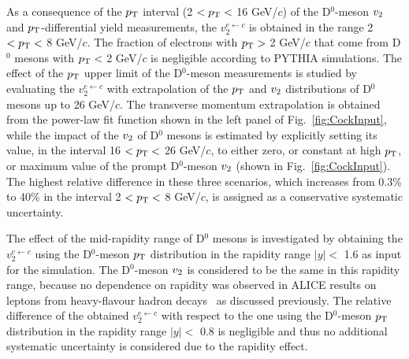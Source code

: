 \documentclass[11pt,a4paper]{article}
\providecommand{\pT}{$p_{\rm T}$ }
\providecommand{\vtwo}{$v_{\rm 2}$ }
\begin{document}
As a consequence of the \pT interval (2 $<  p_{\rm T} <$ 16 GeV/$c$) of the D$^{0}$-meson \vtwo and $p_{\rm T}$-differential yield measurements, the  $v_{2}^{e \leftarrow c}$ is obtained in the range 2 $< p_{\rm T} <$ 8 GeV/$c$.
The fraction of electrons with $p_{\rm T} >$ 2 GeV/$c$ that come from D$^{0}$ mesons with $p_{\rm T} <$ 2 GeV/$c$ is negligible according to PYTHIA simulations.
The effect of the \pT upper limit  of the D$^{0}$-meson measurements is studied by evaluating the $v_{2}^{e \leftarrow c}$ with extrapolation of the \pT and \vtwo  distributions of D$^{0}$ mesons up to 26 GeV/$c$.  The transverse momentum extrapolation is obtained from the power-law fit function shown in the left panel of Fig.~\ref{fig:CockInput}, while the impact of the \vtwo of D$^{0}$ mesons is estimated by explicitly setting its value, in the interval 16 $< p_{\rm T} <$ 26 GeV/$c$, to either zero, or constant at high $p_{\rm T}$, or maximum value of the prompt D$^{0}$-meson $v_{\rm 2}$ (shown in Fig.~\ref{fig:CockInput}). The highest relative difference in these three scenarios, which increases from 0.3\% to 40\% in the interval 2 $< p_{\rm T} <$ 8 GeV/$c$, is assigned as a conservative systematic uncertainty.

The effect of the mid-rapidity range of D$^{0}$ mesons is investigated by obtaining the $v_{2}^{e \leftarrow c}$ using the D$^{0}$-meson $p_{\rm T}$ distribution in the rapidity range $|y| <$ 1.6 as input for the simulation. The D$^{0}$-meson \vtwo is considered to be the same in this rapidity range, because no dependence on rapidity was observed in ALICE results on leptons from heavy-flavour hadron decays~\cite{Adam:2016ssk,HFERAA} as discussed previously. The relative difference of the obtained $v_{2}^{e \leftarrow c}$ with respect to the one using the D$^{0}$-meson $p_{\rm T}$ distribution in the rapidity range $|y| <$ 0.8 is negligible and thus no additional systematic uncertainty is considered due to the rapidity effect.
\end{document}
